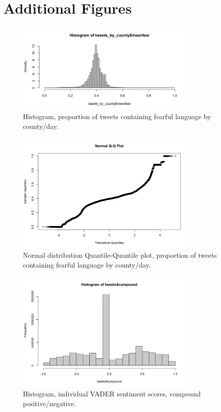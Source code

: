 \documentclass{article}
\begin{document}
\section{Additional Figures} \label{add-figs}
\begin{figure}[h!]
  \includegraphics[width=0.8\textwidth]{figs/n30_hist.png}    
  \centering
  \caption{Histogram, proportion of tweets containing fearful language by county/day.}
  \label{n30_hist}
\end{figure}
\begin{figure}[h!]
  \includegraphics[width=0.8\textwidth]{figs/n30_qplot.png}    
  \centering
  \caption{Normal distribution Quantile-Quantile plot, proportion of tweets containing fearful language by county/day.}
  \label{n30_qplot}
\end{figure}
\begin{figure}[h!]
  \includegraphics[width=0.8\textwidth]{figs/compound_hist.png}    
  \centering
  \caption{Histogram, individual VADER sentiment scores, compound positive/negative.}
  \label{comp_hist}
  
\end{figure}
\end{document}

